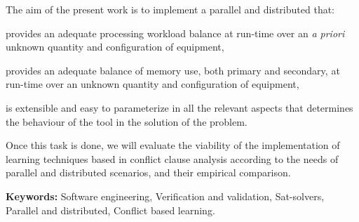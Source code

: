 The aim of the present work is to implement a parallel and distributed
\ssolver that: \begin{inparaenum}[a)]   \item provides an adequate processing
workload balance at run-time over an \emph{a priori} unknown quantity and
configuration of equipment, \item provides an adequate balance of memory use,
both primary and secondary, at run-time over an unknown quantity and
configuration of equipment, \item is extensible and easy to parameterize in
all the relevant aspects that determines the behaviour of the tool in the
solution of the problem. \end{inparaenum} Once this task is done, we will
evaluate the viability of the implementation of learning techniques based in
conflict clause analysis according to the needs of parallel and distributed
scenarios, and their empirical comparison.

\bigskip

\noindent \textbf{Keywords:} Software engineering, Verification and
validation, Sat-solvers, Parallel and distributed, Conflict based learning.
